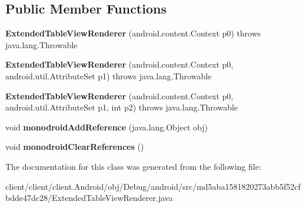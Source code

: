 \subsection*{Public Member Functions}
\begin{DoxyCompactItemize}
\item 
\hypertarget{classmd5aba1581820273abb5f52cfbdde47dc28_1_1ExtendedTableViewRenderer_ada123078bfaa2b3743a02f960783e82a}{}{\bfseries Extended\+Table\+View\+Renderer} (android.\+content.\+Context p0)  throws java.\+lang.\+Throwable 	\label{classmd5aba1581820273abb5f52cfbdde47dc28_1_1ExtendedTableViewRenderer_ada123078bfaa2b3743a02f960783e82a}

\item 
\hypertarget{classmd5aba1581820273abb5f52cfbdde47dc28_1_1ExtendedTableViewRenderer_a0621f5e5cbf2aac03a22d2a9412a4415}{}{\bfseries Extended\+Table\+View\+Renderer} (android.\+content.\+Context p0, android.\+util.\+Attribute\+Set p1)  throws java.\+lang.\+Throwable 	\label{classmd5aba1581820273abb5f52cfbdde47dc28_1_1ExtendedTableViewRenderer_a0621f5e5cbf2aac03a22d2a9412a4415}

\item 
\hypertarget{classmd5aba1581820273abb5f52cfbdde47dc28_1_1ExtendedTableViewRenderer_a05f257e057dd5f059777c14024a6daef}{}{\bfseries Extended\+Table\+View\+Renderer} (android.\+content.\+Context p0, android.\+util.\+Attribute\+Set p1, int p2)  throws java.\+lang.\+Throwable 	\label{classmd5aba1581820273abb5f52cfbdde47dc28_1_1ExtendedTableViewRenderer_a05f257e057dd5f059777c14024a6daef}

\item 
\hypertarget{classmd5aba1581820273abb5f52cfbdde47dc28_1_1ExtendedTableViewRenderer_a2045a48cfffcead5358e2c61a6a9c6fc}{}void {\bfseries monodroid\+Add\+Reference} (java.\+lang.\+Object obj)\label{classmd5aba1581820273abb5f52cfbdde47dc28_1_1ExtendedTableViewRenderer_a2045a48cfffcead5358e2c61a6a9c6fc}

\item 
\hypertarget{classmd5aba1581820273abb5f52cfbdde47dc28_1_1ExtendedTableViewRenderer_aba2297bf91971e74b1c5bbfd42f8a8bf}{}void {\bfseries monodroid\+Clear\+References} ()\label{classmd5aba1581820273abb5f52cfbdde47dc28_1_1ExtendedTableViewRenderer_aba2297bf91971e74b1c5bbfd42f8a8bf}

\end{DoxyCompactItemize}


The documentation for this class was generated from the following file\+:\begin{DoxyCompactItemize}
\item 
client/client/client.\+Android/obj/\+Debug/android/src/md5aba1581820273abb5f52cfbdde47dc28/Extended\+Table\+View\+Renderer.\+java\end{DoxyCompactItemize}
